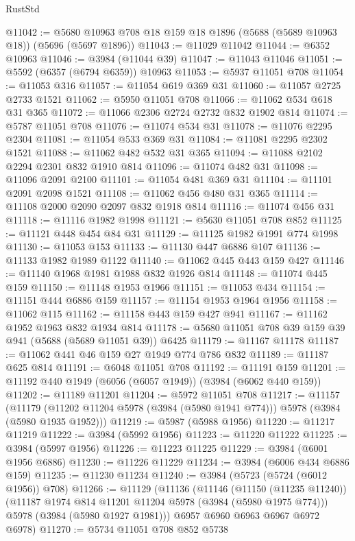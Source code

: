 \begin{lexlean}{RustStd}
\begin{coremodule}
@11042 := @5680 @10963 @708 @18 @159 @18 @1896 (@5688 (@5689 @10963 @18)) (@5696 (@5697 @1896))
@11043 := @11029 @11042
@11044 := @6352 @10963
@11046 := @3984 (@11044 @39)
@11047 := @11043 @11046
@11051 := @5592 (@6357 (@6794 @6359)) @10963
@11053 := @5937 @11051 @708
@11054 := @11053 @316
@11057 := @11054 @619 @369 @31
@11060 := @11057 @2725 @2733 @1521
@11062 := @5950 @11051 @708
@11066 := @11062 @534 @618 @31 @365
@11072 := @11066 @2306 @2724 @2732 @832 @1902 @814
@11074 := @5787 @11051 @708
@11076 := @11074 @534 @31
@11078 := @11076 @2295 @2304
@11081 := @11054 @533 @369 @31
@11084 := @11081 @2295 @2302 @1521
@11088 := @11062 @482 @532 @31 @365
@11094 := @11088 @2102 @2294 @2301 @832 @1910 @814
@11096 := @11074 @482 @31
@11098 := @11096 @2091 @2100
@11101 := @11054 @481 @369 @31
@11104 := @11101 @2091 @2098 @1521
@11108 := @11062 @456 @480 @31 @365
@11114 := @11108 @2000 @2090 @2097 @832 @1918 @814
@11116 := @11074 @456 @31
@11118 := @11116 @1982 @1998
@11121 := @5630 @11051 @708 @852
@11125 := @11121 @448 @454 @84 @31
@11129 := @11125 @1982 @1991 @774 @1998
@11130 := @11053 @153
@11133 := @11130 @447 @6886 @107
@11136 := @11133 @1982 @1989 @1122
@11140 := @11062 @445 @443 @159 @427
@11146 := @11140 @1968 @1981 @1988 @832 @1926 @814
@11148 := @11074 @445 @159
@11150 := @11148 @1953 @1966
@11151 := @11053 @434
@11154 := @11151 @444 @6886 @159
@11157 := @11154 @1953 @1964 @1956
@11158 := @11062 @115
@11162 := @11158 @443 @159 @427 @941
@11167 := @11162 @1952 @1963 @832 @1934 @814
@11178 := @5680 @11051 @708 @39 @159 @39 @941 (@5688 (@5689 @11051 @39)) @6425
@11179 := @11167 @11178
@11187 := @11062 @441 @46 @159 @27 @1949 @774 @786 @832
@11189 := @11187 @625 @814
@11191 := @6048 @11051 @708
@11192 := @11191 @159
@11201 := @11192 @440 @1949 (@6056 (@6057 @1949)) (@3984 (@6062 @440 @159))
@11202 := @11189 @11201
@11204 := @5972 @11051 @708
@11217 := @11157
    (@11179 (@11202 @11204 @5978 (@3984 (@5980 @1941 @774))) @5978 (@3984 (@5980 @1935 @1952)))
@11219 := @5987 (@5988 @1956)
@11220 := @11217 @11219
@11222 := @3984 (@5992 @1956)
@11223 := @11220 @11222
@11225 := @3984 (@5997 @1956)
@11226 := @11223 @11225
@11229 := @3984 (@6001 @1956 @6886)
@11230 := @11226 @11229
@11234 := @3984 (@6006 @434 @6886 @159)
@11235 := @11230 @11234
@11240 := @3984 (@5723 (@5724 (@6012 @1956)) @708)
@11266 := @11129
    (@11136
      (@11146
        (@11150 (@11235 @11240))
        (@11187 @1974 @814 @11201 @11204 @5978 (@3984 (@5980 @1975 @774)))
        @5978
        (@3984 (@5980 @1927 @1981)))
      @6957
      @6960
      @6963
      @6967
      @6972
      @6978)
@11270 := @5734 @11051 @708 @852 @5738

\end{coremodule}
\end{lexlean}
